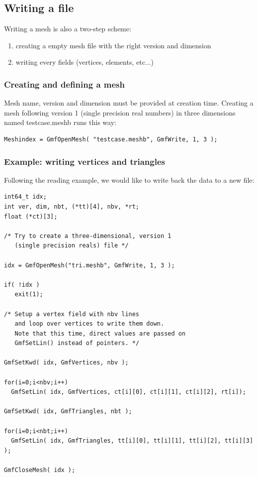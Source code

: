 \documentclass[a4paper,12pt]{article}
\begin{document}
\subsection{Writing a file}

Writing a mesh is also a two-step scheme:

\begin{enumerate}
\item creating a empty mesh file with the right version and dimension
\item writing every fields (vertices, elements, etc...)
\end{enumerate}

\subsubsection{Creating and defining a mesh}

Mesh name, version and dimension must be provided at creation time. Creating a mesh following version 1 (single precision real numbers) in three dimensions named testcase.meshb runs this way:

\begin{tt}
\begin{verbatim}
Meshindex = GmfOpenMesh( "testcase.meshb", GmfWrite, 1, 3 );
\end{verbatim}
\end{tt}
\normalfont

\subsubsection{Example: writing vertices and triangles}

Following the reading example, we would like to write back the data to a new file:

\begin{tt}
\begin{verbatim}
int64_t idx;
int ver, dim, nbt, (*tt)[4], nbv, *rt;
float (*ct)[3];

/* Try to create a three-dimensional, version 1
   (single precision reals) file */

idx = GmfOpenMesh("tri.meshb", GmfWrite, 1, 3 );

if( !idx )
   exit(1);

/* Setup a vertex field with nbv lines
   and loop over vertices to write them down.
   Note that this time, direct values are passed on
   GmfSetLin() instead of pointers. */

GmfSetKwd( idx, GmfVertices, nbv );

for(i=0;i<nbv;i++)
  GmfSetLin( idx, GmfVertices, ct[i][0], ct[i][1], ct[i][2], rt[i]);

GmfSetKwd( idx, GmfTriangles, nbt );

for(i=0;i<nbt;i++)
  GmfSetLin( idx, GmfTriangles, tt[i][0], tt[i][1], tt[i][2], tt[i][3] );

GmfCloseMesh( idx );
\end{verbatim}
\end{tt}
\normalfont
\end{document}
